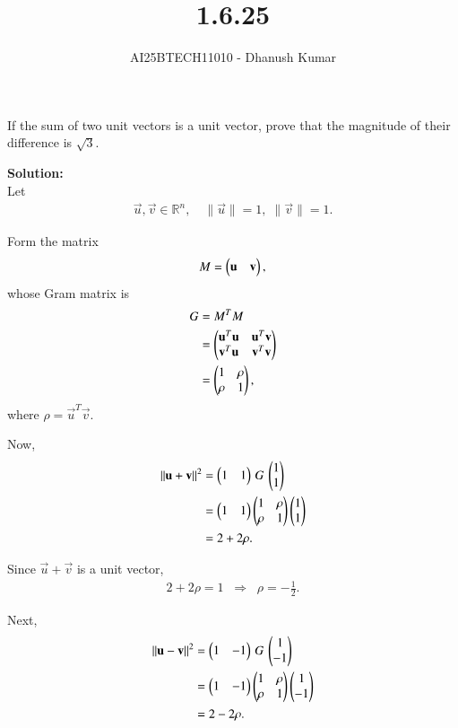 \documentclass[journal]{IEEEtran}
\begin{document}
\title{1.6.25}
\author{AI25BTECH11010 - Dhanush Kumar}
\maketitle
\renewcommand{\thefigure}{\theenumi}
\renewcommand{\thetable}{\theenumi}

\noindent

If the sum of two unit vectors is a unit vector, prove that the magnitude of their difference is \(\sqrt{3}\).

\bigskip
\noindent\textbf{Solution:} \\

Let
\begin{align}
\vec{u}, \vec{v} \in \mathbb{R}^n, \quad
\|\vec{u}\|=1,\;\|\vec{v}\|=1.
\end{align}

Form the matrix
\begin{align}
M = \begin{pmatrix}\mathbf{u} & \mathbf{v}\end{pmatrix},
\end{align}
whose Gram matrix is
\begin{align}
G &= M^TM \\
  &= \begin{pmatrix} \mathbf{u}^T\mathbf{u} & \mathbf{u}^T\mathbf{v} \\ \mathbf{v}^T\mathbf{u} & \mathbf{v}^T\mathbf{v} \end{pmatrix} \\
  &= \begin{pmatrix}1 & \rho \\ \rho & 1\end{pmatrix},
\end{align}
where \(\rho = \vec{u}^T\vec{v}\).

Now,
\begin{align}
\|\mathbf{u}+\mathbf{v}\|^2 
&= \begin{pmatrix}1 & 1\end{pmatrix} \, G \, \begin{pmatrix}1 \\ 1\end{pmatrix} \\
&= \begin{pmatrix}1 & 1\end{pmatrix}\begin{pmatrix}1 & \rho \\ \rho & 1\end{pmatrix}\begin{pmatrix}1 \\ 1\end{pmatrix} \\
&= 2 + 2\rho.
\end{align}

Since \(\vec{u}+\vec{v}\) is a unit vector,
\begin{align}
2 + 2\rho = 1 \;\;\Rightarrow\;\; \rho = -\tfrac{1}{2}.
\end{align}

Next,
\begin{align}
\|\mathbf{u}-\mathbf{v}\|^2 
&= \begin{pmatrix}1 & -1\end{pmatrix} \, G \, \begin{pmatrix}1 \\ -1\end{pmatrix} \\
&= \begin{pmatrix}1 & -1\end{pmatrix}\begin{pmatrix}1 & \rho \\ \rho & 1\end{pmatrix}\begin{pmatrix}1 \\ -1\end{pmatrix} \\
&= 2 - 2\rho.
\end{align}
\end{document}
